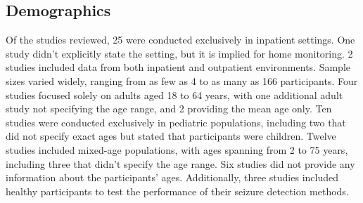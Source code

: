\subsection{Demographics}

Of the studies reviewed, 25 were conducted exclusively in inpatient settings. One study didn’t explicitly state the setting, but it is implied for home monitoring. 2 studies included data from both inpatient and outpatient environments. Sample sizes varied widely, ranging from as few as 4 to as many as 166  participants. Four studies focused solely on adults aged 18 to 64 years, with one additional adult study not specifying the age range, and 2 providing the mean age only. Ten studies were conducted exclusively in pediatric populations, including two that did not specify exact ages but stated that participants were children. Twelve studies included mixed-age populations, with ages spanning from 2 to 75 years, including three that didn’t specify the age range. Six studies did not provide any information about the participants' ages. Additionally, three studies included healthy participants to test the performance of their seizure detection methods.
